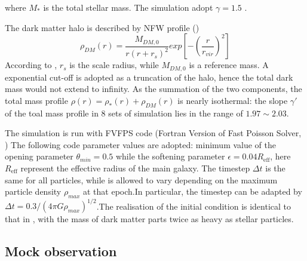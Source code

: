 \documentclass[fleqn,usenatbib]{mnras}
\begin{document}
where $M_*$ is the total stellar mass. The simulation adopt $\gamma = 1.5$ . 
\par The dark matter halo is described by NFW profile (\cite{NFW})
\begin{equation}
    \label{eq:profile_halo}
    \rho_{DM}(r) = \frac{M_{DM,0}}{r(r+r_s)^2} exp\left[-\left(\frac{r}{r_{vir}}\right)^2\right]
\end{equation}
According to \cite{nipoti2009}, $r_s$ is the scale radius, while $M_{DM,0}$ is a reference mass. A exponential cut-off is adopted as a truncation of the halo, hence the total dark mass would not extend to infinity. As the summation of the two components, the total mass profile $\rho(r) = \rho_*(r) + \rho_{DM}(r)$ is nearly isothermal: the slope $\gamma'$ of the toal mass profile in 8 sets of simulation lies in the range of $1.97 \sim 2.03$.

\par The simulation is run with FVFPS code (Fortran Version of Fast Poisson Solver, \cite{londrillo03,nipoti03}) The following code parameter values are adopted: minimum value of the opening parameter $\theta_{min} = 0.5$ while the softening parameter $\epsilon = 0.04 R_\text{eff}$, here $R_\text{eff}$ represent the effective radius of the main galaxy. The timestep $\Delta t$ is the same for all particles, while is allowed to vary depending on the maximum particle density $\rho_{max}$ at that epoch.In particular, the timestep can be adapted by $\Delta t = 0.3/(4\pi G \rho_{max})^{1/2}$.The realisation of the initial condition is identical to that in \cite{nipoti2009}, with the mass of dark matter parts twice as heavy as stellar particles.
\subsection{Mock observation}

\end{document}
